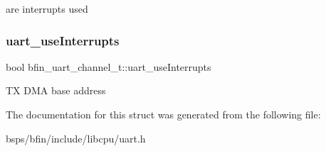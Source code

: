 are interrupts used \mbox{\label{structbfin__uart__channel__t_a3c3737ae8ae9c93227a9b78cc8743ac7}} 
\subsubsection{\texorpdfstring{uart\_useInterrupts}{uart\_useInterrupts}}
{\footnotesize\ttfamily bool bfin\+\_\+uart\+\_\+channel\+\_\+t\+::uart\+\_\+use\+Interrupts}

TX D\+MA base address 

The documentation for this struct was generated from the following file\+:\begin{DoxyCompactItemize}
\item 
bsps/bfin/include/libcpu/uart.\+h\end{DoxyCompactItemize}
